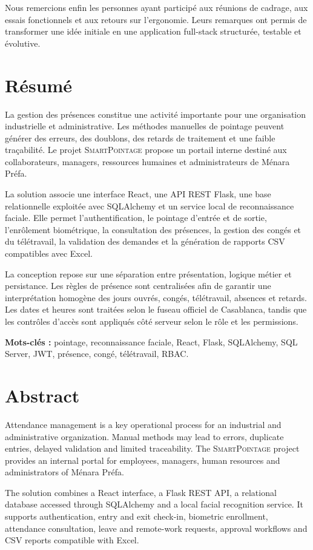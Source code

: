 \documentclass[11pt,a4paper,oneside]{report}
\newcommand{\smartpointage}{\textsc{SmartPointage}}
\newcommand{\menara}{Ménara Préfa}
\begin{document}
Nous remercions enfin les personnes ayant participé aux réunions de cadrage, aux essais fonctionnels et aux retours sur l'ergonomie. Leurs remarques ont permis de transformer une idée initiale en une application full-stack structurée, testable et évolutive.
\newpage
\chapter*{Résumé}
La gestion des présences constitue une activité importante pour une organisation industrielle et administrative. Les méthodes manuelles de pointage peuvent générer des erreurs, des doublons, des retards de traitement et une faible traçabilité. Le projet \smartpointage{} propose un portail interne destiné aux collaborateurs, managers, ressources humaines et administrateurs de \menara{}.

La solution associe une interface React, une API REST Flask, une base relationnelle exploitée avec SQLAlchemy et un service local de reconnaissance faciale. Elle permet l'authentification, le pointage d'entrée et de sortie, l'enrôlement biométrique, la consultation des présences, la gestion des congés et du télétravail, la validation des demandes et la génération de rapports CSV compatibles avec Excel.

La conception repose sur une séparation entre présentation, logique métier et persistance. Les règles de présence sont centralisées afin de garantir une interprétation homogène des jours ouvrés, congés, télétravail, absences et retards. Les dates et heures sont traitées selon le fuseau officiel de Casablanca, tandis que les contrôles d'accès sont appliqués côté serveur selon le rôle et les permissions.

\textbf{Mots-clés :} pointage, reconnaissance faciale, React, Flask, SQLAlchemy, SQL Server, JWT, présence, congé, télétravail, RBAC.
\newpage
\chapter*{Abstract}
Attendance management is a key operational process for an industrial and administrative organization. Manual methods may lead to errors, duplicate entries, delayed validation and limited traceability. The \smartpointage{} project provides an internal portal for employees, managers, human resources and administrators of \menara{}.

The solution combines a React interface, a Flask REST API, a relational database accessed through SQLAlchemy and a local facial recognition service. It supports authentication, entry and exit check-in, biometric enrollment, attendance consultation, leave and remote-work requests, approval workflows and CSV reports compatible with Excel.
\newpage
\tableofcontents
\newpage
\listoffigures
\newpage
\listoftables
\newpage
{}
\end{document}
